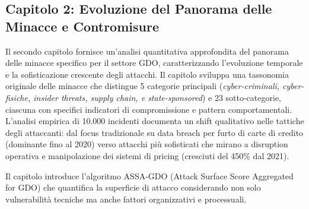 \subsection{Capitolo 2: Evoluzione del Panorama delle Minacce e Contromisure}

Il secondo capitolo fornisce un'analisi quantitativa approfondita del panorama delle minacce specifico per il settore GDO, caratterizzando l'evoluzione temporale e la sofisticazione crescente degli attacchi. Il capitolo sviluppa una tassonomia originale delle minacce che distingue 5 categorie principali (\emph{cyber-criminali, cyber-fisiche, insider threats, supply chain, e state-sponsored}) e 23 sotto-categorie, ciascuna con specifici indicatori di compromissione e pattern comportamentali. L'analisi empirica di 10.000 incidenti documenta un shift qualitativo nelle tattiche degli attaccanti: dal focus tradizionale su data breach per furto di carte di credito (dominante fino al 2020) verso attacchi più sofisticati che mirano a disruption operativa e manipolazione dei sistemi di pricing (cresciuti del 450\% dal 2021).

Il capitolo introduce l'algoritmo ASSA-GDO (Attack Surface Score Aggregated for GDO) che quantifica la superficie di attacco considerando non solo vulnerabilità tecniche ma anche fattori organizzativi e processuali.


      
      


